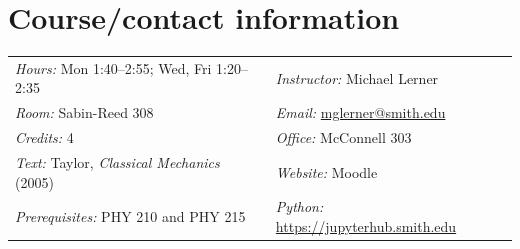 %
%
%

\usepackage{amsmath,amssymb}
\usepackage{booktabs}
\usepackage{listings}
\usepackage{tikz}
\usetikzlibrary{arrows.meta}
\lstset{language=Python, basicstyle=\ttfamily\small, columns=fullflexible,
  keepspaces=true, commentstyle=\itshape, showstringspaces=false,
  xleftmargin=1.5em, frame=none}
\usepackage[normalem]{ulem}
\hypersetup{linkcolor=linkblue,urlcolor=linkblue,anchorcolor=linkblue}
\setlength{\emergencystretch}{1.5em}
\newcommand{\todonote}[1]{{\color{red} \textbf{[TODO: #1]}}}
\pagestyle{fancy}



\newlength{\rcollength}\setlength{\rcollength}{2.55in}%
%
\section{Course/contact information}
%
\begin{tabular}[t]{@{}p{\textwidth-\rcollength}l}
\textit{Hours:} Mon 1:40--2:55; Wed, Fri 1:20--2:35 & \textit{Instructor:} Michael Lerner \\
\textit{Room:} Sabin-Reed 308 & \textit{Email:} \href{mailto:mglerner@smith.edu}{mglerner@smith.edu} \\
\textit{Credits:} 4 & \textit{Office:} McConnell 303 \\
\textit{Text:} Taylor, \textit{Classical Mechanics} (2005) & \textit{Website:} Moodle \\
\textit{Prerequisites:} PHY 210 and PHY 215 & \textit{Python:} \url{https://jupyterhub.smith.edu} \\[1ex]
\end{tabular}~

